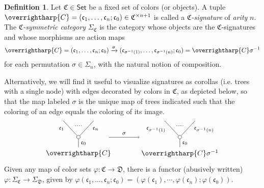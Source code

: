 \documentclass[a4paper,10pt
,draft
]{article}%
\numberwithin{equation}{section}
\numberwithin{figure}{section}
\theoremstyle{definition} %
\newtheorem{definition}[equation]{Definition}%
\newcommand{\vect}[1]{\text{\overrightharp{\ensuremath{#1}}}}
\newcommand{\1}{\ensuremath{\mathbbm 1}}%
\begin{document}
\begin{definition}\label{CSYM DEF}
	Let $\mathfrak {C} \in \mathsf{Set}$ be a fixed set of colors (or objects).
	A tuple
	$\vect C = (\mathfrak c_1, \dots, \mathfrak c_n; \mathfrak c_0) \in \mathfrak{C}^{\times n+1}$
	is called a \textit{$\mathfrak {C}$-signature} of \textit{arity} $n$.
	The \textit{$\mathfrak C$-symmetric category} $\Sigma_{\mathfrak C}$ is the category whose objects are the $\mathfrak{C}$-signatures and whose morphisms are action maps
	\begin{equation}\label{CSYM EQ1}
	\vect{C} =
	(\mathfrak c_1, \dots, \mathfrak c_n; \mathfrak c_0) \xrightarrow{\sigma} (\mathfrak c_{\sigma^{-1}(1)}, \dots, \mathfrak c_{\sigma^{-1}(n)}; \mathfrak c_0)
	= \vect{C} \sigma^{-1}
	\end{equation}
	for each permutation $\sigma \in \Sigma_n$, with the natural notion of composition.
	
	Alternatively, we will find it useful to visualize signatures as corollas (i.e. trees with a single node)
	with edges decorated by colors in $\mathfrak{C}$, as depicted below, so that the map labeled $\sigma$
	is the unique map of trees indicated such that the coloring of an edge equals the coloring of its image.
	\begin{equation}\label{CSYM EQ2}
	\begin{tikzpicture}
	[grow=up,auto,level distance=2.3em,every node/.style = {font=\footnotesize},dummy/.style={circle,draw,inner sep=0pt,minimum size=1.75mm}]
	
	\node at (0,0) [font=\normalsize]{$\vect{C}$}
	child{node [dummy] {}
		child{
			edge from parent node [swap,near end] {$\mathfrak c_n$} node [name=Kn] {}}
		child{
			edge from parent node [near end] {$\mathfrak c_1$}
			node [name=Kone,swap] {}}
		edge from parent node [swap] {$\mathfrak c_0$}
	};
	\draw [dotted,thick] (Kone) -- (Kn) ;
	\node at (5,0) [font=\normalsize] {$\vect{C} \sigma^{-1}
		$}
	child{node [dummy] {}
		child{
			edge from parent node [swap,near end] {$\mathfrak c_{\sigma^{-1}(n)}$} node [name=Kn] {}}
		child{
			edge from parent node [near end] {$\mathfrak c_{\sigma^{-1}(1)}$}
			node [name=Kone,swap] {}}
		edge from parent node [swap] {$\mathfrak c_0$}
	};
	\draw [dotted,thick] (Kone) -- (Kn) ;
	
	\draw[->] (1.5,0.8) -- node{$\sigma$} (3,0.8);
	\end{tikzpicture}
	\end{equation}
	Given any map of color sets $\varphi \colon \mathfrak{C} \to \mathfrak{D}$,
	there is a functor (abusively written)
	$\varphi \colon \Sigma_{\mathfrak{C}} \to \Sigma_{\mathfrak{D}}$,
	given by 
	$\varphi (\mathfrak c_1, \dots, \mathfrak c_n; \mathfrak c_0) = (\varphi(\mathfrak c_1),\cdots,\varphi(\mathfrak c_n);\varphi(\mathfrak c_0))$. 
\end{definition}
\end{document}
